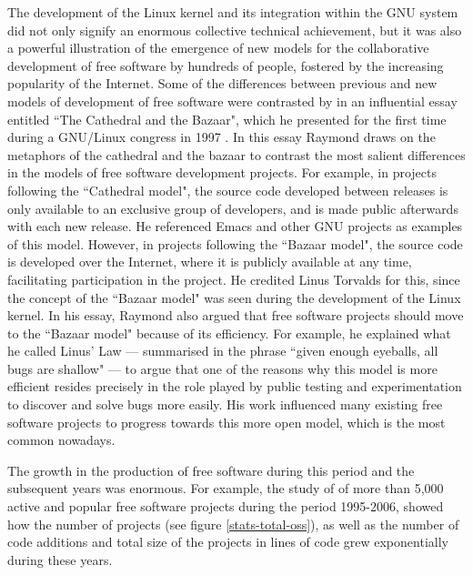 The development of the Linux kernel and its integration within the GNU system did not only signify an enormous collective technical achievement, but it was also a powerful illustration of the emergence of new models for the collaborative development of free software by hundreds of people, fostered by the increasing popularity of the Internet. Some of the differences between previous and new models of development of free software were contrasted by \textcite{Raymond2001} in an influential essay entitled ``The Cathedral and the Bazaar", which he presented for the first time during a GNU\slash Linux congress in 1997 \parencite{linux-congress97:2013:Online}. In this essay Raymond draws on the metaphors of the cathedral and the bazaar to contrast the most salient differences in the models of free software development projects. For example, in projects following the ``Cathedral model", the source code developed between releases is only available to an exclusive group of developers, and is made public afterwards with each new release. He referenced Emacs and other GNU projects as examples of this model. However, in projects following the ``Bazaar model", the source code is developed over the Internet, where it is publicly available at any time, facilitating participation in the project. He credited Linus Torvalds for this, since the concept of the ``Bazaar model" was seen during the development of the Linux kernel. In his essay, Raymond also argued that free software projects should move to the ``Bazaar model" because of its efficiency. For example, he explained what he called Linus' Law --- summarised in the phrase ``given enough eyeballs, all bugs are shallow" --- to argue that one of the reasons why this model is more efficient resides precisely in the role played by public testing and experimentation to discover and solve bugs more easily. His work influenced many existing free software projects to progress towards this more open model, which is the most common nowadays.

The growth in the production of free software during this period and the subsequent years was enormous. For example, the study of \textcite{deshpande2008total} of more than 5,000 active and popular free software projects during the period 1995-2006, showed how the number of projects (see figure \ref{stats-total-oss}), as well as the number of code additions and total size of the projects in lines of code grew exponentially during these years.

